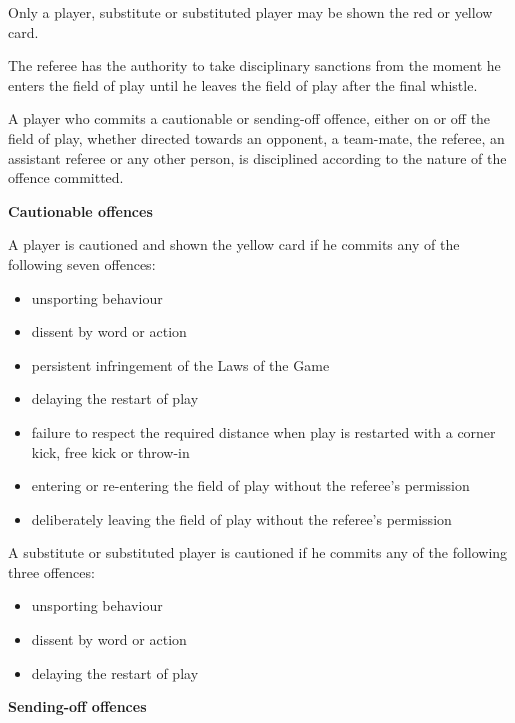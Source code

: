 {\bigskip

Only a player, substitute or substituted player may be shown the red or yellow card.

\bigskip

The referee has the authority to take disciplinary sanctions from the moment he enters the field of play until he leaves the field of play after the final whistle. 

\bigskip

A player who commits a cautionable or sending-off offence, either on or off the field of play, whether directed towards an opponent, a team-mate, the referee, an assistant referee or any other person, is disciplined according to the nature of the offence committed.

\bigskip

{\bfseries Cautionable offences }

\headlinebox

A player is cautioned and shown the yellow card if he commits any of the following seven offences: 

\begin{itemize}
\item unsporting behaviour
\item dissent by word or action
\item persistent infringement of the Laws of the Game
\item delaying the restart of play
\item failure to respect the required distance when play is restarted with a corner kick, free kick or throw-in
\item entering or re-entering the field of play without the referee's permission
\item deliberately leaving the field of play without the
referee's permission
\end{itemize}

\bigskip

A substitute or substituted player is cautioned if he commits any of the following three offences: 

\begin{itemize}
\item unsporting behaviour
\item dissent by word or action 
\item delaying the restart of play
\end{itemize}

{\bfseries Sending-off offences}

\headlinebox

}
